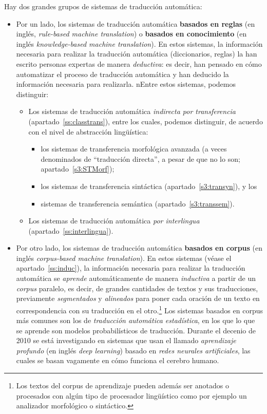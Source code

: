 Hay dos grandes grupos de sistemas de traducción automática: \begin{itemize} \item Por un lado, los sistemas de traducción automática \textbf{basados en reglas} (en inglés, \emph{rule-based machine translation}) o \textbf{basados en conocimiento} (en inglés \emph{knowledge-based machine translation}). En estos sistemas, la información necesaria para realizar la traducción automática (diccionarios, reglas) la han escrito personas expertas de manera \emph{deductiva}: es decir, han pensado en cómo automatizar el proceso de traducción automática y  han deducido la información necesaria para realizarla. nEntre estos sistemas, podemos distinguir: \begin{itemize} \item Los sistemas de traducción automática \emph{indirecta por transferencia} (apartado~\ref{ss:classtrans}), entre los cuales, podemos distinguir, de acuerdo con el nivel de abstracción lingüística: \begin{itemize} \item los sistemas de transferencia morfológica avanzada (a veces denominados de ``traducción directa'', a pesar de que no lo son; apartado~\ref{s3:STMorf}); \item los sistemas de transferencia sintáctica (apartado~\ref{s3:transyn}), y los \item sistemas de transferencia semántica (apartado~\ref{s3:transsem}). \end{itemize} \item Los sistemas de traducción automática \emph{por interlingua} (apartado~\ref{ss:interlingua}). \end{itemize} \item Por otro lado, los sistemas de traducción automática \textbf{basados en corpus} (en inglés \emph{corpus-based machine translation}). En estos sistemas (véase el apartado~\ref{ss:induc}), la información necesaria para realizar la traducción automática se \emph{aprende} automáticamente de manera \emph{inductiva} a partir de un \emph{corpus} paralelo, es decir, de grandes cantidades de textos y sus traducciones, previamente \emph{segmentados} y \emph{alineados} para poner cada oración de un texto en correspondencia con su traducción en el otro.\footnote{Los textos del corpus de aprendizaje pueden además ser anotados o procesados con algún tipo de procesador lingüístico como por ejemplo un analizador morfológico o sintáctico.} Los sistemas basados en corpus más comunes son los de \emph{traducción automática estadística}, en los que lo que se aprende son modelos probabilísticos de traducción. Durante el decenio de 2010 se está investigando en sistemas que usan el llamado \emph{aprendizaje profundo} (en inglés \emph{deep learning}) basado en \emph{redes neurales artificiales}, las cuales se basan vagamente en cómo funciona el cerebro humano. \end{itemize} 

